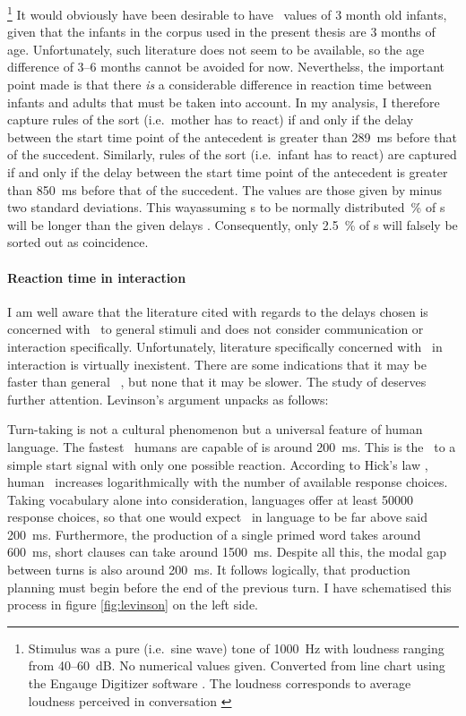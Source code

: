 \footnote{Stimulus was a pure (i.e.~sine wave) tone of 1000~Hz with loudness ranging from 40--60~dB. No numerical values given. Converted from line chart using the Engauge Digitizer software \citep{mitchell02}. The loudness corresponds to average loudness perceived in conversation \citep[]{goerne06}} It would obviously have been desirable to have \rt\ values of 3 month old infants, given that the infants in the  corpus used in the present thesis are 3 months of age. Unfortunately, such literature does not seem to be available, so the age difference of 3--6 months cannot be avoided for now. Neverthelss, the important point made is that there \emph{is} a considerable difference in reaction time between infants and adults that must be taken into account. In my analysis, I therefore capture rules of the sort  (i.e.~mother has to react) if and only if the delay between the start time point of the antecedent is greater than 289~ms before that of the succedent. Similarly, rules of the sort  (i.e.~infant has to react) are captured if and only if the delay between the start time point of the antecedent is greater than 850~ms before that of the succedent. The values are those given by \citet{leibold02} minus two standard deviations. This way\dash assuming \rt s to be normally distributed~\% of \rt s will be longer than the given delays \citep[]{moore16}. Consequently, only 2.5~\% of \rt s will falsely be sorted out as coincidence.

\paragraph{Reaction time in interaction}
I am well aware that the literature cited with regards to the delays chosen is concerned with \rt\ to general stimuli and does not consider communication or interaction specifically. Unfortunately, literature specifically concerned with \rt\ in interaction is virtually inexistent. There are some indications that it may be faster than general \rt\ \citep{levinson16}, but none that it may be slower. The study of \citet{levinson16} deserves further attention. Levinson's argument unpacks as follows:

Turn-taking is not a cultural phenomenon but a universal feature of human language. The fastest \rt\ humans are capable of is around 200~ms. This is the \rt\ to a simple start signal with only one possible reaction. According to Hick's law \citep{hick52}, human \rt\ increases logarithmically with the number of available response choices. Taking vocabulary alone into consideration, languages offer at least 50000 response choices, so that one would expect \rt\ in language to be far above said 200~ms. Furthermore, the production of a single primed word takes around 600~ms, short clauses can take around 1500~ms. Despite all this, the modal gap between turns is also around 200~ms. It follows logically, that production planning must begin before the end of the previous turn. I have schematised this process in figure \ref{fig:levinson} on the left side.

